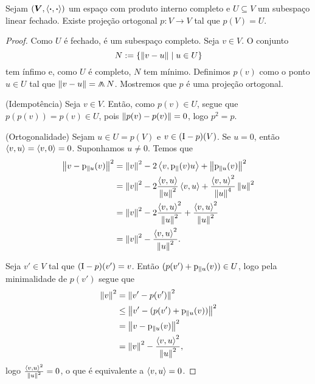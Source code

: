 \begin{proposition}
Sejam $(\bm V, \left\langle{\bm{\cdot}},{\bm{\cdot}}\right\rangle)$ um espaço com produto interno completo e $U \subseteq V$ um subespaço linear fechado. Existe projeção ortogonal $p\colon V \to V$ tal que $p(V)=U$.
\end{proposition}
\begin{proof}
Como $U$ é fechado, é um subespaço completo. Seja $v \in V$. O conjunto
	\begin{equation*}
	N := \left\{{\left\Vert{v-u}\right\Vert}\;\middle\vert\;{u \in U}\right\}
	\end{equation*}
tem ínfimo e, como $U$ é completo, $N$ tem mínimo. Definimos $p(v)$ como o ponto $u \in U$ tal que $\nor{v-u} = \min N$. %
Mostremos que $p$ é uma projeção ortogonal.

(Idempotência) Seja $v \in V$. Então, como $p(v) \in U$, segue que $p(p(v)) = p(v) \in U$, pois $\left\Vert{p(v) - p(v)}\right\Vert=0$, logo $p^2=p$.

(Ortogonalidade) Sejam $u \in U=p(V)$ e $v \in (\mathrm{I}-p)(V)$. Se $u=0$, então $\left\langle{v},{u}\right\rangle = \left\langle{v},{0}\right\rangle=0$. Suponhamos $u \neq 0$. Temos que
	\begin{align*}
	\left\Vert{v - \mathrm{p}_{\parallel u}(v)}\right\Vert^2 &= \left\Vert{v}\right\Vert^2 - 2\left\langle{v},{\mathrm{p}_{\parallel}(v) u}\right\rangle + \left\Vert{\mathrm{p}_{\parallel u}(v)}\right\Vert^2 \\
		&= \left\Vert{v}\right\Vert^2 - 2\frac{\left\langle{v},{u}\right\rangle}{\left\Vert{u}\right\Vert^2}\left\langle{v},{u}\right\rangle + \frac{\left\langle{v},{u}\right\rangle^2}{\left\Vert{u}\right\Vert^4}\left\Vert{u}\right\Vert^2 \\
		&=  \left\Vert{v}\right\Vert^2 - 2\frac{\left\langle{v},{u}\right\rangle^2}{\left\Vert{u}\right\Vert^2} + \frac{\left\langle{v},{u}\right\rangle^2}{\left\Vert{u}\right\Vert^2} \\
		&= \left\Vert{v}\right\Vert^2 - \frac{\left\langle{v},{u}\right\rangle^2}{\left\Vert{u}\right\Vert^2}.
	\end{align*}

Seja $v' \in V$ tal que $(\mathrm{I}-p)(v')=v$. Então $(p(v') + \mathrm{p}_{\parallel u}(v)) \in U$, logo pela minimalidade de $p(v')$ segue que
	\begin{align*}
	\left\Vert{v}\right\Vert^2 &= \left\Vert{v'-p(v')}\right\Vert^2 \\
		&\leq \left\Vert{v'-(p(v') + \mathrm{p}_{\parallel u}(v))}\right\Vert^2 \\
		&= \left\Vert{v - \mathrm{p}_{\parallel u}(v)}\right\Vert^2 \\
		&= \left\Vert{v}\right\Vert^2 - \frac{\left\langle{v},{u}\right\rangle^2}{\left\Vert{u}\right\Vert^2},
	\end{align*}
logo $\frac{\left\langle{v},{u}\right\rangle^2}{\left\Vert{u}\right\Vert^2} = 0$, o que é equivalente a $\left\langle{v},{u}\right\rangle=0$.


\end{proof}
